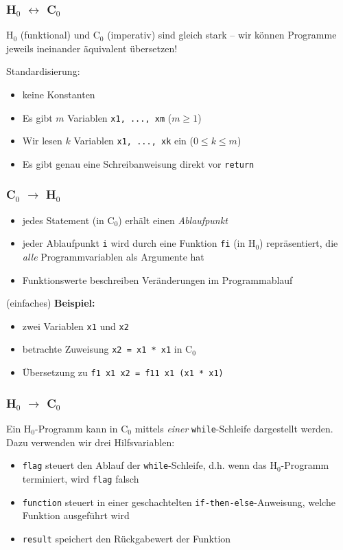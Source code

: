 \documentclass{beamer}
\begin{document}
{

\begin{frame} \frametitle{H${}_\text{0}$ $\leftrightarrow$ C${}_\text{0}$}
	H${}_\text{0}$ (funktional) und C${}_\text{0}$ (imperativ) sind gleich stark -- wir können Programme jeweils ineinander äquivalent übersetzen!
	
	Standardisierung: 
	\begin{itemize}
		\item keine Konstanten
		\item Es gibt $m$ Variablen \texttt{x1, ..., xm} ($m \ge 1$)
		\item Wir lesen $k$ Variablen \texttt{x1, ..., xk} ein ($0 \le k \le m$)
		\item Es gibt genau eine Schreibanweisung direkt vor \texttt{return}
	\end{itemize}
\end{frame}

\begin{frame} \frametitle{C${}_\text{0}$ $\to$ H${}_\text{0}$}
	\begin{itemize}
		\item jedes Statement (in C${}_\text{0}$) erhält einen \textit{Ablaufpunkt}
		\item jeder Ablaufpunkt \texttt{i} wird durch eine Funktion \texttt{fi} (in H${}_\text{0}$) repräsentiert, die \textit{alle} Programmvariablen als Argumente hat
		\item Funktionswerte beschreiben Veränderungen im Programmablauf
	\end{itemize}

	(einfaches) \textbf{Beispiel:} 
	\begin{itemize}
		\item zwei Variablen \texttt{x1} und \texttt{x2}
		\item betrachte Zuweisung \texttt{x2 = x1 * x1} in C${}_\text{0}$
		\item Übersetzung zu \texttt{f1 x1 x2 = f11 x1 (x1 * x1)}
	\end{itemize}
\end{frame}


\begin{frame} \frametitle{H${}_\text{0}$ $\to$ C${}_\text{0}$}
	Ein H${}_\text{0}$-Programm kann in C${}_\text{0}$ mittels \textit{einer} \texttt{while}-Schleife dargestellt werden. Dazu verwenden wir drei Hilfsvariablen:
	\begin{itemize}
		\item \texttt{flag} steuert den Ablauf der \texttt{while}-Schleife, d.h. wenn das H${}_\text{0}$-Programm terminiert, wird \texttt{flag} falsch
		\item \texttt{function} steuert in einer geschachtelten \texttt{if-then-else}-Anweisung, welche Funktion ausgeführt wird
		\item \texttt{result} speichert den Rückgabewert der Funktion
	\end{itemize}
\end{frame}
}
\end{document}
